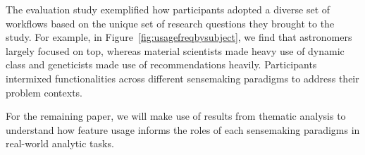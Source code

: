 \par The evaluation study exemplified how participants adopted a diverse set of workflows based on the unique set of research questions they brought to the study. For example, in Figure~\ref{fig:usagefreqbysubject}, we find that astronomers largely focused on top, whereas material scientists made heavy use of dynamic class and geneticists made use of recommendations heavily. Participants intermixed functionalities across different sensemaking paradigms to address their problem contexts.
\par For the remaining paper, we will make use of results from thematic analysis to understand how feature usage informs the roles of each sensemaking paradigms in real-world analytic tasks.
